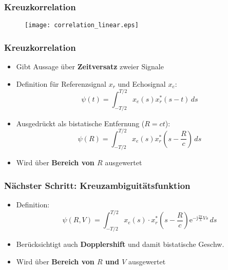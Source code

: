 \begin{frame}
    \frametitle{Kreuzkorrelation}

    \begin{figure}
        \centering
        \texttt{[image: correlation\_linear.eps]}
    \end{figure}
\end{frame}

\begin{frame}
    \frametitle{Kreuzkorrelation}

    \begin{itemize}
        \item Gibt Aussage über \textbf{Zeitversatz} zweier Signale
        \item Definition für Referenzsignal \(x_{r}\) und Echosignal \(x_{e}\):
              \begin{equation}
                  \psi(t) = \int_{-T/2}^{T/2}{ x_{e}(s) x_{r}^{*}(s - t) \, d s}
              \end{equation}
        \item<2-> Ausgedrückt als bistatische Entfernung (\(R = c t\)):
              \begin{equation}
                  \psi(R) = \int_{-T/2}^{T/2}{ x_{e}(s) x_{r}^{*} \left( s - \frac{R}{c} \right) \, d s}
              \end{equation}
        \item<3-> Wird über \textbf{Bereich von \(R\)} ausgewertet
    \end{itemize}
\end{frame}

\begin{frame}
    \frametitle{Nächster Schritt: Kreuzambiguitätsfunktion}

    \begin{itemize}
        \item Definition:
              \begin{equation}
                  \psi(R, V) = \int_{-T/2}^{T/2} {x_{e}(s) \cdot x_{r}^{*}} \left( s - \frac{R}{c} \right)\mathrm{e}^{- \mathrm{j} \frac{2 \pi}{\lambda} V s} \, d s
              \end{equation}
        \item Berücksichtigt auch \textbf{Dopplershift} und damit bistatische Geschw.
        \item Wird über \textbf{Bereich von \(R\) und \(V\)} ausgewertet
    \end{itemize}
\end{frame}

